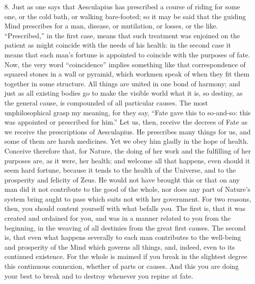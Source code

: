 \documentclass{book}
\begin{document}
8. Just as one says that Aesculapius has prescribed a course of riding
for some one, or the cold bath, or walking bare-footed; so it may be
said that the guiding Mind prescribes for a man, disease, or
mutilation, or losses, or the like. ``Prescribed,'' in the first case,
means that such treatment was enjoined on the patient as might
coincide with the needs of his health: in the second case it means
that each man's fortune is appointed to coincide with the purposes of
fate. Now, the very word ``coincidence'' implies something like that
correspondence of squared stones in a wall or pyramid, which workmen
speak of when they fit them together in some structure. All things are
united in one bond of harmony; and just as all existing bodies go to
make the visible world what it is, so destiny, as the general cause,
is compounded of all particular causes. The most unphilosophical grasp
my meaning, for they say, ``Fate gave this to so-and-so: this was
appointed or prescribed for him.'' Let us, then, receive the decrees of
Fate as we receive the prescriptions of Aesculapius. He prescribes
many things for us, and some of them are harsh medicines. Yet we obey
him gladly in the hope of health. Conceive therefore that, for Nature,
the doing of her work and the fulfilling of her purposes are, as it
were, her health; and welcome all that happens, even should it seem
hard fortune, because it tends to the health of the Universe, and to
the prosperity and felicity of Zeus. He would not have brought this or
that on any man did it not contribute to the good of the whole, nor
does any part of Nature's system bring aught to pass which suits not
with her government. For two reasons, then, you should content
yourself with what befalls you. The first is, that it was created and
ordained for you, and was in a manner related to you from the
beginning, in the weaving of all destinies from the great first
causes. The second is, that even what happens severally to each man
contributes to the well-being and prosperity of the Mind which governs
all things, and, indeed, even to its continued existence. For the
whole is maimed if you break in the slightest degree this continuous
connexion, whether of parts or causes. And this you are doing your
best to break and to destroy whenever you repine at fate.
\end{document}
